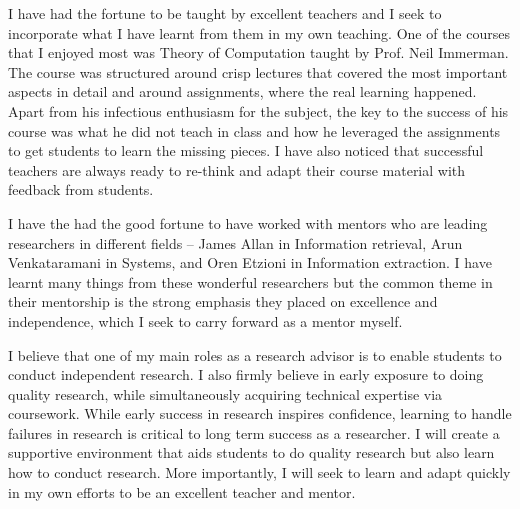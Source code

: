 \documentclass[a4paper,11pt,onecolumn]{article}
\begin{document}
I have had the fortune to be taught by excellent teachers and I seek to incorporate what I have learnt from them in my own teaching. One of the courses that I enjoyed most was Theory of Computation taught by Prof. Neil Immerman. The course was structured around crisp lectures that covered the most important aspects in detail and around assignments, where the real learning happened. Apart from his infectious enthusiasm for the subject, the key to the success of his course was what he did not teach in class and how he leveraged the assignments to get students to learn the missing pieces. I have also noticed that successful teachers are always ready to re-think and adapt their course material with feedback from students. 

I have the had the good fortune to have worked with mentors who are leading researchers in different fields -- James Allan in Information retrieval, Arun Venkataramani in Systems, and Oren Etzioni in Information extraction. I have learnt many things from these wonderful researchers but the common theme in their mentorship is the strong emphasis they placed on excellence and independence, which I seek to carry forward as a mentor myself. 

I believe that one of my main roles as a research advisor is to enable students to conduct independent research. I also firmly believe in early exposure to doing quality research, while simultaneously acquiring technical expertise via coursework. While early success in research inspires confidence, learning to handle failures in research is critical to long term success as a researcher. I will create a supportive environment that aids students to do quality research but also learn how to conduct research. More importantly, I will seek to learn and adapt quickly in my own efforts to be an excellent teacher and mentor.


\end{document}
